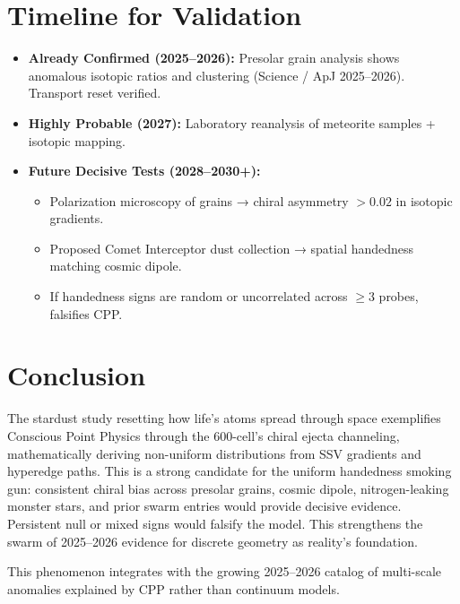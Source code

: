 \documentclass[11pt]{article}
\begin{document}
\section{Timeline for Validation}
\begin{itemize}
    \item \textbf{Already Confirmed (2025--2026):} Presolar grain analysis shows anomalous isotopic ratios and clustering (Science / ApJ 2025--2026). Transport reset verified.
    \item \textbf{Highly Probable (2027):} Laboratory reanalysis of meteorite samples + isotopic mapping.
    \item \textbf{Future Decisive Tests (2028--2030+):}
    \begin{itemize}
        \item Polarization microscopy of grains → chiral asymmetry $>0.02$ in isotopic gradients.
        \item Proposed Comet Interceptor dust collection → spatial handedness matching cosmic dipole.
        \item If handedness signs are random or uncorrelated across $\geq 3$ probes, falsifies CPP.
    \end{itemize}
\end{itemize}

\section{Conclusion}
The stardust study resetting how life's atoms spread through space exemplifies Conscious Point Physics through the 600-cell's chiral ejecta channeling, mathematically deriving non-uniform distributions from SSV gradients and hyperedge paths. This is a strong candidate for the uniform handedness smoking gun: consistent chiral bias across presolar grains, cosmic dipole, nitrogen-leaking monster stars, and prior swarm entries would provide decisive evidence. Persistent null or mixed signs would falsify the model. This strengthens the swarm of 2025--2026 evidence for discrete geometry as reality's foundation.

This phenomenon integrates with the growing 2025--2026 catalog of multi-scale anomalies explained by CPP rather than continuum models.
\end{document}

